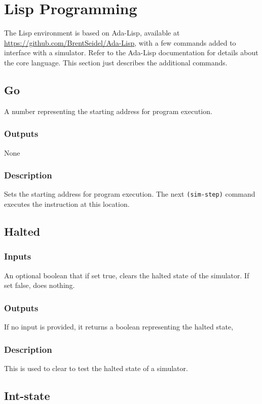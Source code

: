 \documentclass[10pt, openany]{book}
\begin{document}
\section{Lisp Programming}
The Lisp environment is based on Ada-Lisp, available at \url{https://github.com/BrentSeidel/Ada-Lisp}, with a few commands added to interface with a simulator.  Refer to the Ada-Lisp documentation for details about the core language.  This section just describes the additional commands.

\subsection{Go}
A number representing the starting address for program execution.
\subsubsection{Outputs}
None
\subsubsection{Description}
Sets the starting address for program execution.  The next \verb|(sim-step)| command executes the instruction at this location.

\subsection{Halted}
\subsubsection{Inputs}
An optional boolean that if set true, clears the halted state of the simulator.  If set false, does nothing.
\subsubsection{Outputs}
If no input is provided, it returns a boolean representing the halted state, 
\subsubsection{Description}
This is used to clear to test the halted state of a simulator.

\subsection{Int-state}
\end{document}
